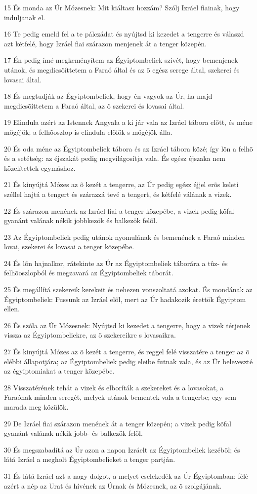 \par 15 És monda az Úr Mózesnek: Mit kiáltasz hozzám? Szólj Izráel fiainak, hogy induljanak el.
\par 16 Te pedig emeld fel a te pálczádat és nyújtsd ki kezedet a tengerre és válaszd azt kétfelé, hogy Izráel fiai szárazon menjenek át a tenger közepén.
\par 17 Én pedig ímé megkeményítem az Égyiptombeliek szívét, hogy bemenjenek utánok, és megdicsõíttetem a Faraó által és az õ egész serege által, szekerei és lovasai által.
\par 18 És megtudják az Égyiptombeliek, hogy én vagyok az Úr, ha majd megdicsõíttetem a Faraó által, az õ szekerei és lovasai által.
\par 19 Elindula azért az Istennek Angyala a ki jár vala az Izráel tábora elõtt, és méne mögéjök; a felhõoszlop is  elindula elõlök s mögéjök álla.
\par 20 És oda méne az Égyiptombeliek tábora és az Izráel tábora közé; így lõn a felhõ és a setétség: az éjszakát pedig megvilágosítja vala. És egész éjszaka nem közelítettek egymáshoz.
\par 21 És kinyújtá Mózes az õ kezét a tengerre, az Úr pedig egész éjjel erõs keleti széllel hajtá a tengert és szárazzá tevé a tengert, és kétfelé válának a vizek.
\par 22 És szárazon menének az Izráel fiai a tenger közepébe, a vizek pedig kõfal gyanánt valának nékik jobbkezök és balkezök felõl.
\par 23 Az Égyiptombeliek pedig utánok nyomulának és bemenének a Faraó minden lovai, szekerei és lovasai a tenger közepébe.
\par 24 És lõn hajnalkor, rátekinte az Úr az Égyiptombeliek táborára a tûz- és felhõoszlopból és megzavará az Égyiptombeliek táborát.
\par 25 És megállítá szekereik kerekeit és nehezen vonszoltatá azokat. És mondának az Égyiptombeliek: Fussunk az Izráel elõl, mert az Úr hadakozik érettök Égyiptom ellen.
\par 26 És szóla az Úr Mózesnek: Nyújtsd ki kezedet a tengerre, hogy a vizek térjenek vissza az Égyiptombeliekre, az õ szekereikre s lovasaikra.
\par 27 És kinyújtá Mózes az õ kezét a tengerre, és reggel felé visszatére a tenger az õ elébbi állapotjára; az Égyiptombeliek pedig eleibe futnak vala, és az Úr beleveszté az égyiptomiakat a tenger közepébe.
\par 28 Visszatérének tehát a vizek és elboríták a szekereket és a lovasokat, a Faraónak minden seregét, melyek utánok bementek vala a tengerbe; egy sem marada meg közülök.
\par 29 De Izráel fiai szárazon menének át a tenger közepén; a vizek pedig kõfal gyanánt valának nékik jobb- és balkezök felõl.
\par 30 És megszabadítá az Úr azon a napon Izráelt az Égyiptombeliek kezébõl; és látá Izráel a megholt Égyiptombelieket a tenger partján.
\par 31 És látá Izráel azt a nagy dolgot, a melyet cselekedék az Úr Égyiptomban: félé azért a nép az Urat és hívének az Úrnak és Mózesnek, az õ szolgájának.

